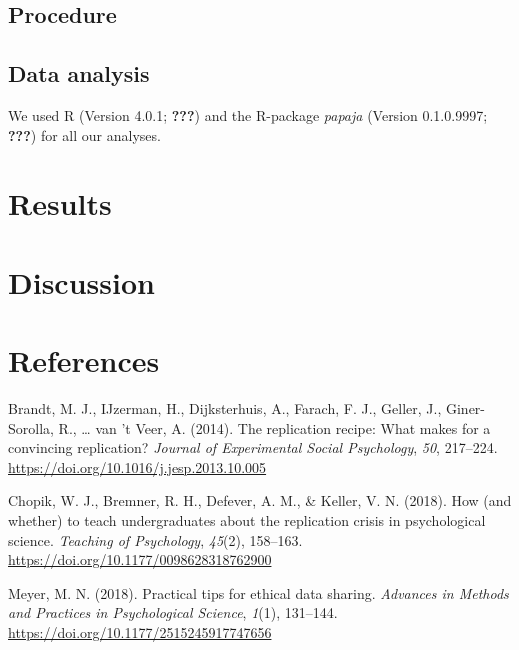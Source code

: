 \documentclass[
  english,
  man,mask,floatsintext]{apa6}
\begin{document}
\hypertarget{procedure}{%
\subsection{Procedure}\label{procedure}}

\hypertarget{data-analysis}{%
\subsection{Data analysis}\label{data-analysis}}

We used R (Version 4.0.1; {\textbf{???}}) and the R-package \emph{papaja} (Version 0.1.0.9997; {\textbf{???}}) for all our analyses.

\hypertarget{results}{%
\section{Results}\label{results}}

\hypertarget{discussion}{%
\section{Discussion}\label{discussion}}

\newpage

\hypertarget{references}{%
\section{References}\label{references}}

\begingroup
\setlength{\parindent}{-0.5in}
\setlength{\leftskip}{0.5in}

\hypertarget{refs}{}
\leavevmode\hypertarget{ref-brandtReplicationRecipeWhat2014}{}%
Brandt, M. J., IJzerman, H., Dijksterhuis, A., Farach, F. J., Geller, J., Giner-Sorolla, R., \ldots{} van 't Veer, A. (2014). The replication recipe: What makes for a convincing replication? \emph{Journal of Experimental Social Psychology}, \emph{50}, 217--224. \url{https://doi.org/10.1016/j.jesp.2013.10.005}

\leavevmode\hypertarget{ref-chopikHowWhetherTeach2018}{}%
Chopik, W. J., Bremner, R. H., Defever, A. M., \& Keller, V. N. (2018). How (and whether) to teach undergraduates about the replication crisis in psychological science. \emph{Teaching of Psychology}, \emph{45}(2), 158--163. \url{https://doi.org/10.1177/0098628318762900}

\leavevmode\hypertarget{ref-meyerPracticalTipsEthical2018}{}%
Meyer, M. N. (2018). Practical tips for ethical data sharing. \emph{Advances in Methods and Practices in Psychological Science}, \emph{1}(1), 131--144. \url{https://doi.org/10.1177/2515245917747656}
\end{document}
